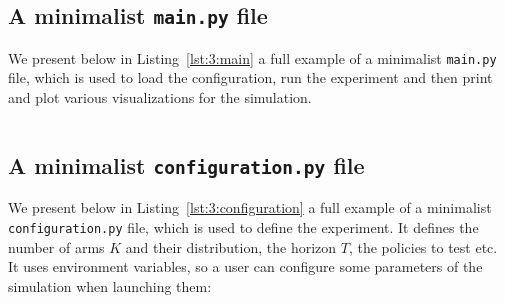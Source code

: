 \begin{small}
    \inputminted[linenos=true,numbersep=5pt,frame=lines,framesep=2mm]{python3}{2-Chapters/3-Chapter/src/example_of_use_of_SMPyBandits.py}
\end{small}


\subsection{A minimalist \texttt{main.py} file}

We present below in Listing~\ref{lst:3:main} a full example of a minimalist \texttt{main.py} file,
which is used to load the configuration, run the experiment and then print and plot various visualizations for the simulation.

\begin{small}
    \inputminted[linenos=true,numbersep=5pt,frame=lines,framesep=2mm]{python3}{2-Chapters/3-Chapter/src/example_of_main_singleplayer.py}
\end{small}


\subsection{A minimalist \texttt{configuration.py} file}

We present below in Listing~\ref{lst:3:configuration} a full example of a minimalist \texttt{configuration.py} file,
which is used to define the experiment.
It defines the number of arms $K$ and their distribution, the horizon $T$, the policies to test etc.
It uses environment variables, so a user can configure some parameters of the simulation when launching them:


